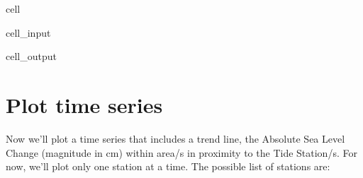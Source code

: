 \documentclass[letterpaper,10pt,english]{jupyterBook}
\begin{document}
\begin{sphinxuseclass}{cell}
\begin{sphinxVerbatimInput}
\begin{sphinxuseclass}{cell_input}
\end{sphinxuseclass}\end{sphinxVerbatimInput}
\begin{sphinxVerbatimOutput}

\begin{sphinxuseclass}{cell_output}
\noindent{}

\end{sphinxuseclass}\end{sphinxVerbatimOutput}

\end{sphinxuseclass}

\chapter{Plot time series}
\label{\detokenize{notebooks/regional_and_local/SL_Trend:plot-time-series}}\label{\detokenize{notebooks/regional_and_local/SL_Trend:asltimeseries}}
\sphinxAtStartPar
Now we’ll plot a time series that includes a trend line, the Absolute Sea Level Change (magnitude in cm) within area/s in proximity to the Tide Station/s. For now, we’ll plot only one station at a time. The possible list of stations are:
\end{document}
